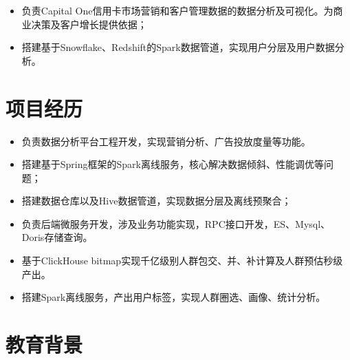 \documentclass{resume}
\begin{document}
\begin{itemize}
  \item 负责Capital One信用卡市场营销和客户管理数据的数据分析及可视化。为商业决策及客户增长提供依据；
  \item 搭建基于Snowflake、Redshift的Spark数据管道，实现用户分层及用户数据分析。
\end{itemize}

\section{项目经历}
\begin{itemize}
  \item 负责数据分析平台工程开发，实现营销分析、广告投放度量等功能。
  \item 搭建基于Spring框架的Spark离线服务，核心解决数据倾斜、性能调优等问题；
  \item 搭建数据仓库以及Hive数据管道，实现数据分层及离线预聚合；
  \item 负责后端微服务开发，涉及业务功能实现，RPC接口开发，ES、Mysql、Doris存储查询。
\end{itemize}

\begin{itemize}
  \item 基于ClickHouse bitmap实现千亿级别人群包交、并、补计算及人群预估秒级产出。
  \item 搭建Spark离线服务，产出用户标签，实现人群圈选、画像、统计分析。
\end{itemize}

\section{教育背景}
\end{document}
